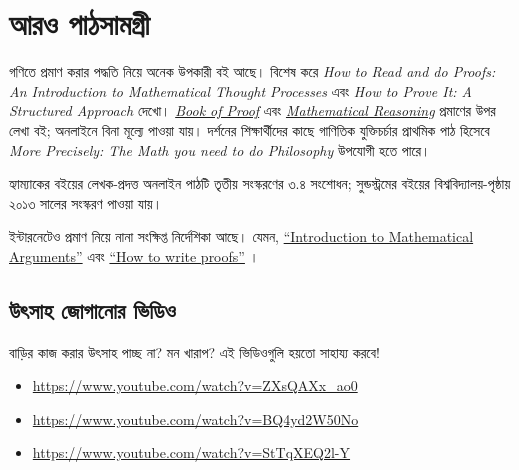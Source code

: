 \documentclass[../../../include/open-logic-section]{subfiles}
\begin{document}

\section{আরও পাঠসামগ্রী}

গণিতে প্রমাণ করার পদ্ধতি নিয়ে অনেক উপকারী বই
আছে। বিশেষ করে \emph{How to Read and do Proofs: An
Introduction to Mathematical Thought Processes}
\citep{Solow2013} এবং \emph{How to Prove It: A
Structured Approach} \citep{Velleman2019} দেখো।
\href{https://richardhammack.github.io/BookOfProof/}{\emph{Book
of Proof}} \citep{Hammack2013} এবং
\href{https://scholarworks.gvsu.edu/books/7/}{\emph{Mathematical
Reasoning}} \citep{Sandstrum2019} প্রমাণের উপর
লেখা বই; অনলাইনে বিনা মূল্যে পাওয়া যায়।
দর্শনের শিক্ষার্থীদের কাছে গাণিতিক যুক্তিচর্চার
প্রাথমিক পাঠ হিসেবে \emph{More
Precisely: The Math you need to do Philosophy}
\citep{Steinhart2018} উপযোগী হতে পারে।

\par\smallskip\noindent হ্যাম্যাকের বইয়ের লেখক-প্রদত্ত অনলাইন পাঠটি তৃতীয় সংস্করণের ৩.৪ সংশোধন; সুন্ডস্ট্রমের বইয়ের বিশ্ববিদ্যালয়-পৃষ্ঠায় ২০১৩ সালের সংস্করণ পাওয়া যায়।

ইন্টারনেটেও প্রমাণ নিয়ে নানা সংক্ষিপ্ত নির্দেশিকা
আছে। যেমন,
\href{https://math.berkeley.edu/~hutching/teach/proofs.pdf}{``Introduction
  to Mathematical Arguments''} \citep{Hutchings2003} এবং
\href{https://eugeniacheng.com/wp-content/uploads/2017/02/cheng-proofguide.pdf}{``How to
  write proofs''} \citep{Cheng2004}।

\subsection{উৎসাহ জোগানোর ভিডিও}

বাড়ির কাজ করার উৎসাহ পাচ্ছ না? মন খারাপ?
এই ভিডিওগুলি হয়তো সাহায্য করবে!

\begin{itemize}
\item \url{https://www.youtube.com/watch?v=ZXsQAXx_ao0}
\item \url{https://www.youtube.com/watch?v=BQ4yd2W50No}
\item \url{https://www.youtube.com/watch?v=StTqXEQ2l-Y}
\end{itemize}
\end{document}
